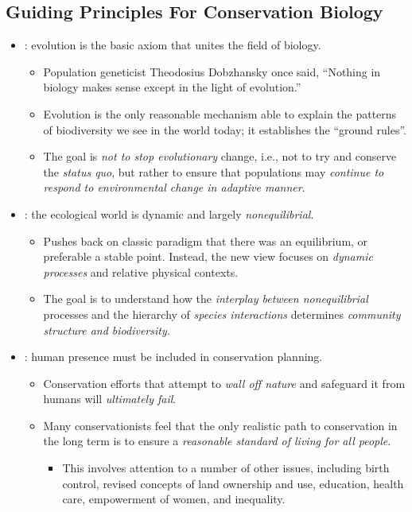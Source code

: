 \documentclass{inVerba-notes}
\begin{document}
\begin{itemize}
    \subsection{Guiding Principles For Conservation Biology}\label{Guiding Principles For Conservation Biology}
    \begin{itemize}
        \item {}: evolution is the basic axiom that unites the field of biology.
            \begin{itemize}
                \item Population geneticist Theodosius Dobzhansky once said, “Nothing in biology makes sense except in the light of evolution.”
                \item Evolution is the only reasonable mechanism able to explain the patterns of biodiversity we see in the world today; it establishes the ``ground rules''.
                \item The goal is \emph{not to stop evolutionary} change, i.e., not to try and conserve the \textit{status quo}, but rather to ensure that populations may \emph{continue to  respond to environmental change in adaptive manner}.
            \end{itemize}
        \item {}: the ecological world is dynamic and largely \emph{nonequilibrial}.
            \begin{itemize}
                \item Pushes back on classic paradigm that there was an equilibrium, or preferable a stable point. Instead, the new view focuses on \emph{dynamic processes} and relative physical contexts. 
                \item The goal is to understand how the \emph{interplay between nonequilibrial} processes and the hierarchy of \emph{species interactions} determines \emph{community structure and biodiversity.}
            \end{itemize}
        \item {}: human presence must be included in conservation planning.
            \begin{itemize}
                \item  Conservation efforts that attempt to \emph{wall
                off nature} and safeguard it from humans will \emph{ ultimately fail}.
                \item Many conservationists feel that the only realistic path to conservation in the long term is to ensure a \emph{reasonable standard of living for all people}.
                    \begin{itemize}
                        \item This involves attention to a number of
                        other issues, including birth control, revised concepts of land ownership and use, education, health care, empowerment of women, and inequality.
                    \end{itemize}
            \end{itemize}
    \end{itemize}
\end{itemize}
\end{document}
